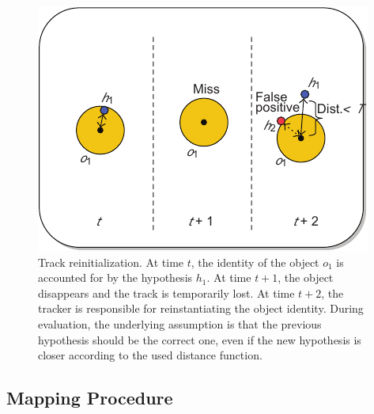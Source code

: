 \begin{figure}[t]
    \centerline{\includegraphics[width=0.5\linewidth]{figures/theoretical_foundations/object_hypothesis_reinit.pdf}}
    \caption[Object-hypothesis re-initialization]{Track reinitialization. At time $t$, the identity of the object $o_1$ is accounted for by the hypothesis $h_1$. At time $t + 1$, the object disappears and the track is temporarily lost. At time $t + 2$, the tracker is responsible for reinstantiating the object identity. During evaluation, the underlying assumption is that the previous hypothesis should be the correct one, even if the new hypothesis is closer according to the used distance function. }
    \label{fig:ObjectHypothesisReInit}
\end{figure}

\subsection{Mapping Procedure}

